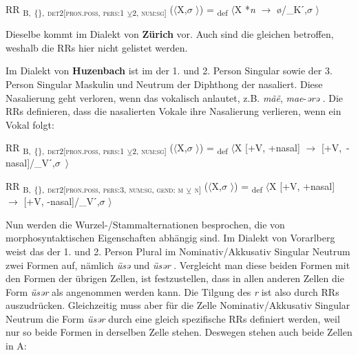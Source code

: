 \ea%
\label{ex:key:160}
 RR \textsubscript{B,} \textsubscript{\{\}}\textsubscript{,} \textsubscript{\textsc{det2[pron.poss}, \textsc{pers:1}} \textsubscript{\tiny $\veebar$}\textsubscript{\textsc{2}, \textsc{num:sg}]} ($\langle$X,$\sigma$ $\rangle$) = \textsubscript{def} $\langle$X *\textit{n} $\rightarrow$ ø/\_Kˊ,$\sigma$ $\rangle$
\z

Dieselbe  kommt im Dialekt von \textbf{Zürich} vor. Auch sind die gleichen  betroffen, weshalb die RRs hier nicht gelistet werden.

Im Dialekt von \textbf{Huzenbach} ist im  der 1. und 2. Person Singular sowie der 3. Person Singular Maskulin und Neutrum der Diphthong der  nasaliert. Diese Nasalierung geht verloren, wenn das  vokalisch anlautet, z.B. \textit{mãẽ}, \textit{mae}-\textit{ərə} \citep[104]{Baur1967}. Die RRs definieren, dass die nasalierten Vokale ihre Nasalierung verlieren, wenn ein Vokal folgt:

\ea%
\label{ex:key:161}
 RR \textsubscript{B,} \textsubscript{\{\}}\textsubscript{,} \textsubscript{\textsc{det2[pron.poss}, \textsc{pers:1}} \textsubscript{\tiny $\veebar$}\textsubscript{\textsc{2}, \textsc{num:sg}]} ($\langle$X,$\sigma$ $\rangle$) = \textsubscript{def} $\langle$X [+V, +nasal] $\rightarrow$ \mbox{[+V, -nasal]/\_Vˊ,$\sigma$ $\rangle$}
\z

\ea%
\label{ex:key:162}
 RR \textsubscript{B,} \textsubscript{\{\}}\textsubscript{,} \textsubscript{\textsc{det2[pron.poss}, \textsc{pers:3}, \textsc{num:sg}, \textsc{gend: m}} \textsubscript{\tiny $\veebar$}\textsubscript{ \textsc{n}}\textsubscript{]} ($\langle$X,$\sigma$ $\rangle$) = \textsubscript{def} $\langle$X [+V, +nasal] $\rightarrow$ [+V, -nasal]/\_Vˊ,$\sigma$ $\rangle$
\z

Nun werden die  Wur\-zel-/Stamm\-al\-ter\-na\-tio\-nen besprochen, die von morphosyntaktischen Eigenschaften abhängig sind. Im Dialekt von Vorarlberg weist das  der 1. und 2. Person Plural im Nominativ/Akkusativ Singular Neutrum zwei Formen auf, nämlich \textit{üsə} und \textit{üsər} \citep[276]{Jutz1925}. Vergleicht man diese beiden Formen mit den Formen der übrigen Zellen, ist festzustellen, dass in allen anderen Zellen die Form \textit{üsər} als  angenommen werden kann. Die Tilgung des \textit{r} ist also durch RRs auszudrücken. Gleichzeitig muss aber für die Zelle Nominativ/Akkusativ Singular Neutrum die Form \textit{üsər} durch eine gleich spezifische RRs definiert werden, weil nur so beide Formen in derselben Zelle stehen. Deswegen stehen auch beide Zellen in  A:

